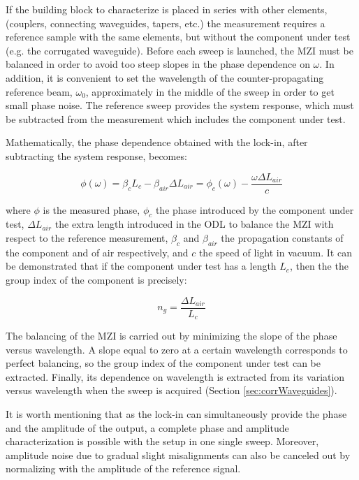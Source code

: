 \documentclass[journal]{IEEEtran}
\begin{document}
If the building block to characterize is placed in series with other elements, (couplers, connecting waveguides, tapers, etc.) the measurement requires a reference sample with the same elements, but without the component under test (e.g. the corrugated waveguide).
Before each sweep is launched, the MZI must be balanced in order to avoid too steep slopes in the phase dependence on $\omega$.
In addition, it is convenient to set the wavelength of the counter-propagating reference beam, $\omega_0$, approximately in the middle of the sweep in order to get small phase noise.
The reference sweep provides the system response, which must be subtracted from the measurement which includes the component under test. 


Mathematically, the phase dependence obtained with the lock-in, after subtracting the system response, becomes:


\begin{equation}
  \phi(\omega)= \beta_c L_c - \beta_{air} \Delta L_{air} =\phi_{c}(\omega)-\frac{\omega\Delta L_{air}}{c}
  \label{eq:response}
\end{equation}

where $\phi$ is the measured phase, $\phi_{c}$ the phase introduced by the component under test, $\Delta L_{air}$ the extra length introduced in the ODL to balance the MZI with respect to the reference measurement, $\beta_c$ and $\beta_{air}$ the propagation constants of the component and of air respectively, and $c$ the speed of light in vacuum. It can be demonstrated \cite{Mas2012} that if the component under test has a length $L_{c}$, then the the group index of the component is precisely:

\begin{equation}
  n_{g} = \frac{\Delta L_{air}}{L_{c}}
  \label{eq:group_index_pathBalancing}
\end{equation}

The balancing of the MZI is carried out by minimizing the slope of the phase versus wavelength. A slope equal to zero at a certain wavelength corresponds to perfect balancing, so the group index of the component under test can be extracted. Finally, its dependence on wavelength is extracted from its variation versus wavelength when the sweep is acquired (Section \ref{sec:corrWaveguides}).

It is worth mentioning that as the lock-in can simultaneously provide the phase and the amplitude of the output, a complete phase and amplitude characterization is possible with the setup in one single sweep. Moreover, amplitude noise due to gradual slight misalignments can also be canceled out by normalizing with the amplitude of the reference signal.
\end{document}
